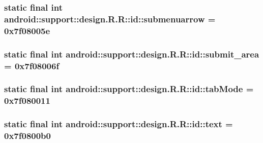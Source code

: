 \hypertarget{classandroid_1_1support_1_1design_1_1_r_1_1id_60c31f763a24cecab56036645e9bb85d}{
\subsubsection[{submenuarrow}]{\setlength{\rightskip}{0pt plus 5cm}static final int android::support::design.R.R::id::submenuarrow = 0x7f08005e}}
\label{classandroid_1_1support_1_1design_1_1_r_1_1id_60c31f763a24cecab56036645e9bb85d}


\hypertarget{classandroid_1_1support_1_1design_1_1_r_1_1id_ddc438905f332c665f0bd73713e695f0}{
\subsubsection[{submit\_\-area}]{\setlength{\rightskip}{0pt plus 5cm}static final int android::support::design.R.R::id::submit\_\-area = 0x7f08006f}}
\label{classandroid_1_1support_1_1design_1_1_r_1_1id_ddc438905f332c665f0bd73713e695f0}


\hypertarget{classandroid_1_1support_1_1design_1_1_r_1_1id_33eb402bfe50dce7196a885025adf8ab}{
\subsubsection[{tabMode}]{\setlength{\rightskip}{0pt plus 5cm}static final int android::support::design.R.R::id::tabMode = 0x7f080011}}
\label{classandroid_1_1support_1_1design_1_1_r_1_1id_33eb402bfe50dce7196a885025adf8ab}


\hypertarget{classandroid_1_1support_1_1design_1_1_r_1_1id_ca42ae5afc6ba65fd619d0a6e64b3381}{
\subsubsection[{text}]{\setlength{\rightskip}{0pt plus 5cm}static final int android::support::design.R.R::id::text = 0x7f0800b0}}
\label{classandroid_1_1support_1_1design_1_1_r_1_1id_ca42ae5afc6ba65fd619d0a6e64b3381}


